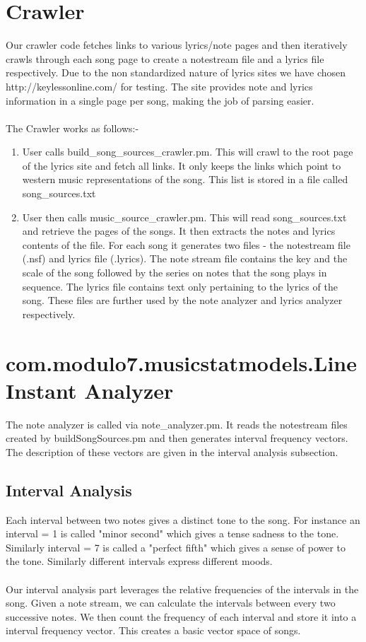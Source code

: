 \documentclass[letterpaper, 11pt]{article}
\begin{document}
\section*{Crawler}
Our crawler code fetches links to various lyrics/note pages and then iteratively crawls through each song page to create a notestream file and a lyrics file respectively. Due to the non standardized nature of lyrics sites we have chosen http://keylessonline.com/ for testing. The site provides note and lyrics information in a single page per song, making the job of parsing easier. \\\\
The Crawler works as follows:-
\begin{enumerate}
\item User calls build\_song\_sources\_crawler.pm. This will crawl to the root page of the lyrics site and fetch all links. It only keeps the links which point to western music representations of the song. This list is stored in a file called song\_sources.txt
\item User then calls music\_source\_crawler.pm. This will read song\_sources.txt and retrieve the pages of the songs. It then extracts the notes and lyrics contents of the file. For each song it generates two files - the notestream file (.nsf) and lyrics file (.lyrics). The note stream file contains the key and the scale of the song followed by the series on notes that the song plays in sequence. The lyrics file contains text only pertaining to the lyrics of the song. These files are further used by the note analyzer and lyrics analyzer respectively. 
\end{enumerate}

\section*{com.modulo7.musicstatmodels.LineInstant Analyzer}
The note analyzer is called via note\_analyzer.pm. It reads the notestream files created by buildSongSources.pm and then generates interval frequency vectors. The description of these vectors are given in the interval analysis subsection.
\subsection*{Interval Analysis}
Each interval between two notes gives a distinct tone to the song. For instance an interval = 1  is called "minor second" which gives a tense sadness to the tone. Similarly interval = 7 is called a "perfect fifth" which gives a sense of power to the tone. Similarly different intervals express different moods. \\\\
Our interval analysis part leverages the relative frequencies of the intervals in the song. Given a note stream, we can calculate the intervals between every two successive notes. We then count the frequency of each interval and store it into a interval frequency vector. This creates a basic vector space of songs. 
\end{document}
